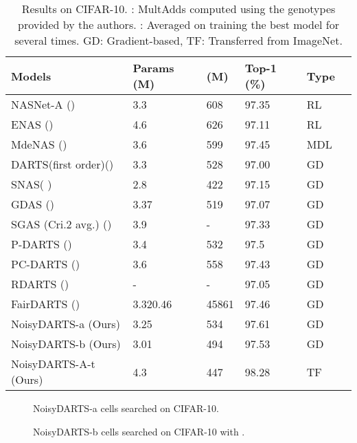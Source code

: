 \documentclass{article}
\begin{document}
\begin{table}
	\begin{center}
		\caption{Results on CIFAR-10. : MultAdds computed using the genotypes provided by the authors. : Averaged on training the best model for several times. GD: Gradient-based, TF: Transferred from ImageNet.} 
		\label{tab:comparison-cifar10}
		\begin{footnotesize}
			\begin{tabular}{*{6}{l}} 			
				\toprule
				Models  & Params (M) &  (M) & Top-1 (\%) & Type  \\
\midrule
				NASNet-A (\cite{zoph2017learning})  & 3.3 & 608  &  97.35 & RL \\
				ENAS (\cite{pham2018efficient}) & 4.6 & 626 & 97.11 & RL     \\	
				MdeNAS (\cite{zheng2019multinomial}) & 3.6 & 599 & 97.45 & MDL \\
				\midrule
				DARTS(first order)(\cite{liu2018darts}) & 3.3 & 528 & 97.00 & GD \\ 
SNAS( \cite{xie2018snas})  & 2.8 & 422 & 97.15 & GD\\
				GDAS (\cite{dong2019searching}) & 3.37 & 519 & 97.07 &GD \\
				SGAS (Cri.2 avg.) (\cite{li2019sgas}) & 3.9 & - & 97.33 & GD\\
				P-DARTS (\cite{chen2019progressive}) & 3.4 & 532 & 97.5 & GD \\ 
				PC-DARTS (\cite{xu2020pcdarts}) & 3.6 & 558 & 97.43 & GD \\ 
				RDARTS (\cite{zela2020understanding}) &-& -& 97.05 & GD \\
				FairDARTS (\cite{chu2019fair}) & 3.320.46  & 45861 & 97.46 & GD \\
NoisyDARTS-a (Ours) & 3.25 & 534 & 97.61 & GD \\
				NoisyDARTS-b (Ours) & 3.01 & 494 & 97.53 & GD \\
				NoisyDARTS-A-t (Ours) & 4.3 & 447 & 98.28 & TF \\
				\bottomrule
			\end{tabular}
		\end{footnotesize}
	\end{center}
\end{table}

\begin{figure}[t]
	\centering
	\caption{NoisyDARTS-a cells searched on CIFAR-10.}
	\label{fig:the-searched-cells-a}
\end{figure} 
\begin{figure}[ht]
	\centering
	\caption{NoisyDARTS-b cells searched on CIFAR-10 with .}
	\label{fig:the-searched-cells-b}
\end{figure}
\end{document}
